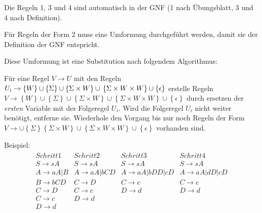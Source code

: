 \documentclass{article}
\begin{document}
Die Regeln 1, 3 und 4 sind automatisch in der GNF (1 nach Übungsblatt, 3 und 4 nach Definition).

Für Regeln der Form 2 muss eine Umformung durchgeführt werden, damit sie der Definition der GNF entspricht.

Diese Umformung ist eine Substitution nach folgendem Algorithmus:

Für eine Regel $V \rightarrow U$ mit den Regeln $U_i \rightarrow \left\{W\right\}\cup\left\{\Sigma\right\}\cup\left\{\Sigma\times W\right\}\cup\\\left\{\Sigma \times W \times W\right\}\cup\left\{\epsilon\right\}$ erstelle Regeln $V \rightarrow \left\{W\right\}\cup\left\{\Sigma\right\}\cup\left\{\Sigma\times W\right\}\cup\left\{\Sigma \times W \times W\right\}\cup\left\{\epsilon\right\}$ durch ersetzen der \textit{ersten} Variable mit der Folgeregel $U_i$. Wird die Folgeregel $U_i$ nicht weiter benötigt, entferne sie.
Wiederhole den Vorgang bis nur noch Regeln der Form $V \rightarrow \cup\left\{\Sigma\right\}\left\{\Sigma\times W\right\}\cup\left\{\Sigma \times W \times W\right\}\cup\left\{\epsilon\right\}$ vorhanden sind.

Beispiel:
\begin{align*}
\begin{array}{llll}
Schritt 1 & Schritt 2 & Schritt 3 & Schritt 4 \\
\hline
S \rightarrow sA     & S \rightarrow sA       & S \rightarrow sA            & S \rightarrow sA \\
A \rightarrow aA | B & A \rightarrow aA | bCD & A \rightarrow aA | bDD | cD & A \rightarrow aA | dD | cD \\
B \rightarrow bCD    & C \rightarrow D        & C \rightarrow c             & C \rightarrow c \\
C \rightarrow D      & C \rightarrow c        & D \rightarrow d             & D \rightarrow d \\
C \rightarrow c      & D \rightarrow d        &                             & \\
D \rightarrow d      &                        &                             & \\
\end{array}
\end{align*}
\end{document}
